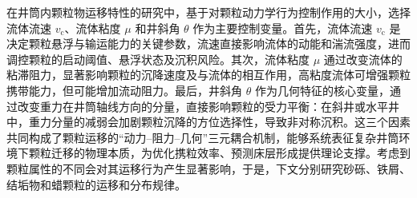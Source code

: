 在井筒内颗粒物运移特性的研究中，基于对颗粒动力学行为控制作用的大小，选择流体流速 \(v_{\mathrm{c}}\)、流体粘度 \(\mu\) 和井斜角 \(\theta\) 作为主要控制变量。首先，流体流速 \(v_{\mathrm{c}}\) 是决定颗粒悬浮与输运能力的关键参数，流速直接影响流体的动能和湍流强度，进而调控颗粒的启动阈值、悬浮状态及沉积风险。其次，流体粘度 \(\mu\) 通过改变流体的粘滞阻力，显著影响颗粒的沉降速度及与流体的相互作用，高粘度流体可增强颗粒携带能力，但可能增加流动阻力。最后，井斜角 \(\theta\) 作为几何特征的核心变量，通过改变重力在井筒轴线方向的分量，直接影响颗粒的受力平衡：在斜井或水平井中，重力分量的减弱会加剧颗粒沉降的方位选择性，导致非对称沉积。这三个因素共同构成了颗粒运移的“动力--阻力--几何”三元耦合机制，能够系统表征复杂井筒环境下颗粒迁移的物理本质，为优化携粒效率、预测床层形成提供理论支撑。考虑到颗粒属性的不同会对其运移行为产生显著影响，于是，下文分别研究砂砾、铁屑、结垢物和蜡颗粒的运移和分布规律。

